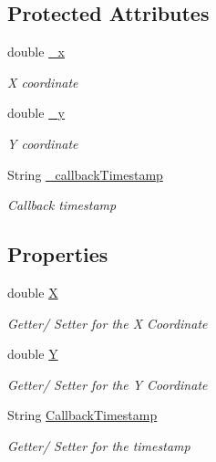 \subsection*{Protected Attributes}
\begin{DoxyCompactItemize}
\item 
double \hyperlink{class_web_analyzer_1_1_models_1_1_base_1_1_base_tracking_data_a38d492dc01a8dbba23ec635874808081}{\+\_\+x}
\begin{DoxyCompactList}\small\item\em X coordinate \end{DoxyCompactList}\item 
double \hyperlink{class_web_analyzer_1_1_models_1_1_base_1_1_base_tracking_data_a435fc601a4a55e8ff46b1e42724cc269}{\+\_\+y}
\begin{DoxyCompactList}\small\item\em Y coordinate \end{DoxyCompactList}\item 
String \hyperlink{class_web_analyzer_1_1_models_1_1_base_1_1_base_tracking_data_a97cfad26e3a27a528776bcccbe7da68d}{\+\_\+callback\+Timestamp}
\begin{DoxyCompactList}\small\item\em Callback timestamp \end{DoxyCompactList}\end{DoxyCompactItemize}
\subsection*{Properties}
\begin{DoxyCompactItemize}
\item 
double \hyperlink{class_web_analyzer_1_1_models_1_1_base_1_1_base_tracking_data_a579bb7898a92e60f4f26cf8a5cbfa46f}{X}
\begin{DoxyCompactList}\small\item\em Getter/ Setter for the X Coordinate \end{DoxyCompactList}\item 
double \hyperlink{class_web_analyzer_1_1_models_1_1_base_1_1_base_tracking_data_ad885c1d6a4adb3f61a09b49d6e1550e7}{Y}
\begin{DoxyCompactList}\small\item\em Getter/ Setter for the Y Coordinate \end{DoxyCompactList}\item 
String \hyperlink{class_web_analyzer_1_1_models_1_1_base_1_1_base_tracking_data_a90e9e6a31ed34b1a7b0bdfa10566ef31}{Callback\+Timestamp}
\begin{DoxyCompactList}\small\item\em Getter/ Setter for the timestamp \end{DoxyCompactList}\end{DoxyCompactItemize}


